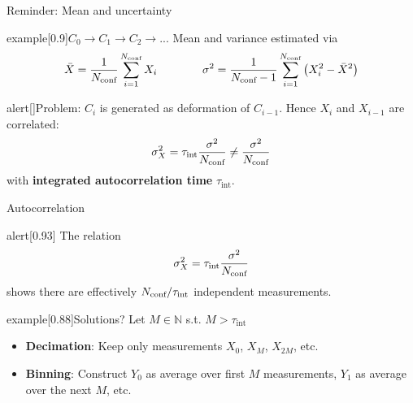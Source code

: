 

\begin{frame}{Reminder: Mean and uncertainty}
    \vspace{-3mm}
    \begin{varblock}{example}[0.9\textwidth]{$C_0\to C_1\to C_2\to...$}
        Mean and variance estimated via
        \vspace{-3mm}
        $$
          \bar{X}=\frac{1}{N_{\text{conf}}}\sum_{i=1}^{N_{\text{conf}}} X_i
        ~~~~ ~~~~ ~~~~
        \sigma^2=\frac{1}{N_{\text{conf}}-1}\sum_{i=1}^{N_{\text{conf}}}\left(X_i^2-\bar{X}^2\right)
        $$
    \end{varblock}
    \begin{varblock}{alert}[\textwidth]{Problem:}
        $C_i$ is generated as deformation of $C_{i-1}$. Hence $X_i$ and
        $X_{i-1}$ are correlated: %
        \begin{equation*}
            \sigma^2_X
            = \tau_{\textrm{int}}\frac{\sigma^2}{N_{\text{conf}}}
            \neq \frac{\sigma^2}{N_{\text{conf}}}
        \end{equation*}
        with \textbf{integrated autocorrelation time} $\tau_{\textrm{int}}$.
    \end{varblock}
\end{frame}

\begin{frame}{Autocorrelation}
    \begin{varblock*}{alert}[0.93\textwidth]{}
        The relation
        $$
        \sigma^2_X
        = \tau_{\textrm{int}}\frac{\sigma^2}{N_{\text{conf}}}
        $$
        shows there are effectively $N_{\text{conf}}/\tau_{\textrm{int}}$ independent
        measurements.
    \end{varblock*}
    \begin{varblock*}{example}[0.88\textwidth]{Solutions?}
        Let $M\in\mathbb{N}$ s.t. $M>\tau_{\textrm{int}}$
        \begin{itemize}
            \item \textbf{Decimation}: Keep only measurements $X_0$,
            $X_M$, $X_{2M}$, etc.
            \item \textbf{Binning}: Construct $Y_0$ as average over first $M$ measurements,
            $Y_1$ as average over the next $M$, etc.
        \end{itemize}
    \end{varblock*}
\end{frame}


